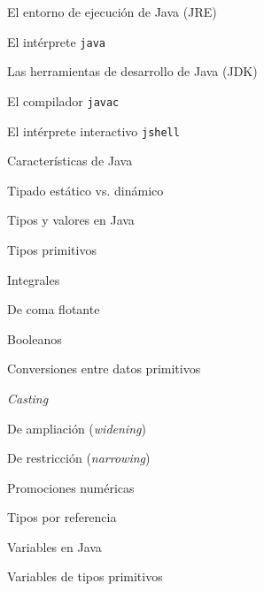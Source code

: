 \begin{longenum}
\begin{longenum}
\begin{longenum}
\begin{longenum}
            \end{longenum}
            \item El entorno de ejecución de Java (JRE)
            \begin{longenum}
                \item El intérprete \texttt{java}
            \end{longenum}
            \item Las herramientas de desarrollo de Java (JDK)
            \begin{longenum}
                \item El compilador \texttt{javac}
                \item El intérprete interactivo \texttt{jshell}
            \end{longenum}
        \end{longenum}
        \item Características de Java
        \item Tipado estático vs. dinámico
        \item Tipos y valores en Java
        \begin{longenum}
            \item Tipos  primitivos
            \begin{longenum}
                \item Integrales
                \item De coma flotante
                \item Booleanos
                \item Conversiones entre datos primitivos
                \begin{longenum}
                    \item \textit{Casting}
                    \item De ampliación (\textit{widening})
                    \item De restricción (\textit{narrowing})
                \end{longenum}
                \item Promociones numéricas
            \end{longenum}
            \item Tipos por referencia
        \end{longenum}
        \item Variables en Java
        \begin{longenum}
            \item Variables de tipos primitivos

\end{longenum}
\end{longenum}
\end{longenum}
